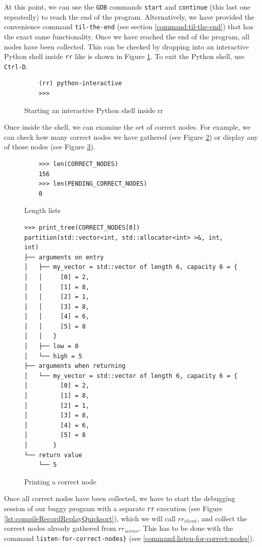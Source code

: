 At this point, we can use the \verb|GDB| commands \verb|start| and \verb|continue| (this last one repeatedly) to reach the end of the program.
Alternatively, we have provided the convenience command \verb|til-the-end| (see section \ref{command:til-the-end}) that has the exact same functionality.
Once we have reached the end of the program, all nodes have been collected. This can be checked by dropping into an interactive Python shell inside \verb|rr| like is shown in Figure \ref{fig:python-interactive}. To exit the Python shell, use \verb|Ctrl-D|.
\begin{figure}[h]
    \centering
    \caption{Starting an interactive Python shell inside rr}
    \label{fig:python-interactive}
    \begin{verbatim}
    (rr) python-interactive
    >>>
    \end{verbatim}
\end{figure}
Once inside the shell, we can examine the set of correct nodes. For example, we can check how many correct nodes we have gathered (see Figure \ref{fig:lengthLists}) or display any of those nodes (see Figure \ref{fig:printCorrectNode}).
\begin{figure}[h]
    \centering
    \caption{Length lists}
    \label{fig:lengthLists}
    \begin{verbatim}
    >>> len(CORRECT_NODES)
    156
    >>> len(PENDING_CORRECT_NODES)
    0
    \end{verbatim}
\end{figure}

\begin{figure}[h]
    \centering
    \caption{Printing a correct node}
    \label{fig:printCorrectNode}
    \begin{verbatim}
>>> print_tree(CORRECT_NODES[0])
partition(std::vector<int, std::allocator<int> >&, int, int)
├── arguments on entry                                      
│   ├── my_vector = std::vector of length 6, capacity 6 = {                 
│   │     [0] = 2,                                                                                           
│   │     [1] = 8,                     
│   │     [2] = 1,                     
│   │     [3] = 8,                     
│   │     [4] = 6,                     
│   │     [5] = 8                     
│   │   }                      
│   ├── low = 0                              
│   └── high = 5                        
├── arguments when returning                       
│   └── my_vector = std::vector of length 6, capacity 6 = {           
│         [0] = 2,
│         [1] = 8,
│         [2] = 1,
│         [3] = 8,
│         [4] = 6,
│         [5] = 8
│       }
└── return value
    └── 5
    \end{verbatim}
\end{figure}
Once all correct nodes have been collected, we have to start the debugging session of our buggy program with a separate \verb|rr| execution (see Figure \ref{lst:compileRecordReplayQuicksort}), which we will call \(rr_{client}\), and collect the correct nodes already gathered from \(rr_{server}\). This has to be done with the command \verb|listen-for-correct-nodes}| (see \ref{command:listen-for-correct-nodes}). 

